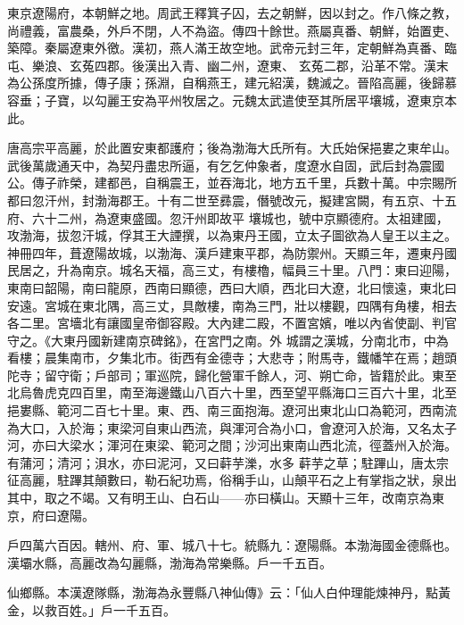 
\begin{pinyinscope}

 東京遼陽府，本朝鮮之地。周武王釋箕子囚，去之朝鮮，因以封之。作八條之教，尚禮義，富農桑，外戶不閉，人不為盜。傳四十餘世。燕屬真番、朝鮮，始置吏、築障。秦屬遼東外徼。漢初，燕人滿王故空地。武帝元封三年，定朝鮮為真番、臨屯、樂浪、玄菟四郡。後漢出入青、幽二州，遼東、
 玄菟二郡，沿革不常。漢末為公孫度所據，傳子康；孫淵，自稱燕王，建元紹漢，魏滅之。晉陷高麗，後歸慕容垂；子寶，以勾麗王安為平州牧居之。元魏太武遣使至其所居平壤城，遼東京本此。



 唐高宗平高麗，於此置安東都護府；後為渤海大氏所有。大氏始保挹婁之東牟山。武後萬歲通天中，為契丹盡忠所逼，有乞乞仲象者，度遼水自固，武后封為震國公。傳子祚榮，建都邑，自稱震王，並吞海北，地方五千里，兵數十萬。中宗賜所都曰忽汗州，封渤海郡王。十有二世至彞震，僭號改元，擬建宮闕，有五京、十五府、六十二州，為遼東盛國。忽汗州即故平
 壤城也，號中京顯德府。太祖建國，攻渤海，拔忽汗城，俘其王大諲撰，以為東丹王國，立太子圖欲為人皇王以主之。神冊四年，葺遼陽故城，以渤海、漢戶建東平郡，為防禦州。天顯三年，遷東丹國民居之，升為南京。城名天福，高三丈，有樓櫓，幅員三十里。八門：東曰迎陽，東南曰韶陽，南曰龍原，西南曰顯德，西曰大順，西北曰大遼，北曰懷遠，東北曰安遠。宮城在東北隅，高三丈，具敵樓，南為三門，壯以樓觀，四隅有角樓，相去各二里。宮墻北有讓國皇帝御容殿。大內建二殿，不置宮嬪，唯以內省使副、判官守之。《大東丹國新建南京碑銘》，在宮門之南。外
 城謂之漢城，分南北市，中為看樓；晨集南市，夕集北市。街西有金德寺；大悲寺；附馬寺，鐵幡竿在焉；趙頭陀寺；留守衛；戶部司；軍巡院，歸化營軍千餘人，河、朔亡命，皆籍於此。東至北烏魯虎克四百里，南至海邊鐵山八百六十里，西至望平縣海口三百六十里，北至挹婁縣、範河二百七十里。東、西、南三面抱海。遼河出東北山口為範河，西南流為大口，入於海；東梁河自東山西流，與渾河合為小口，會遼河入於海，又名太子河，亦曰大梁水；渾河在東梁、範河之間；沙河出東南山西北流，徑蓋州入於海。有蒲河；清河；浿水，亦曰泥河，又曰蓒芋濼，水多
 蓒芋之草；駐蹕山，唐太宗征高麗，駐蹕其顛數曰，勒石紀功焉，俗稱手山，山顛平石之上有掌指之狀，泉出其中，取之不竭。又有明王山、白石山——亦曰橫山。天顯十三年，改南京為東京，府曰遼陽。



 戶四萬六百因。轄州、府、軍、城八十七。統縣九：遼陽縣。本渤海國金德縣也。漢壩水縣，高麗改為勾麗縣，渤海為常樂縣。戶一千五百。



 仙鄉縣。本漢遼隊縣，渤海為永豐縣八神仙傳》云：「仙人白仲理能煉神丹，點黃金，以救百姓。」戶一千五百。




\end{pinyinscope}
